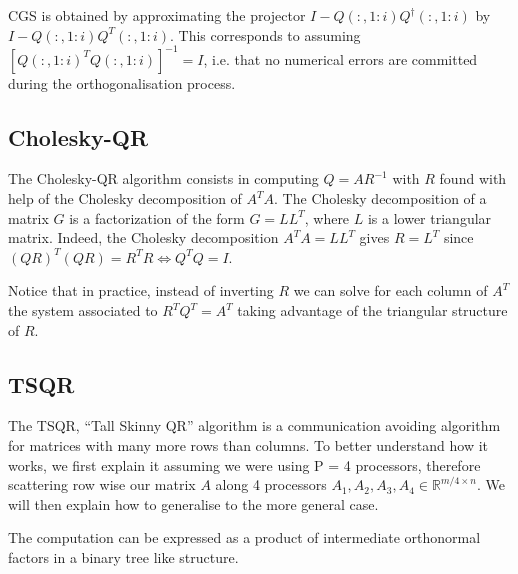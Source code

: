 \documentclass[a4paper, 12pt,oneside]{article}
\begin{document}
			CGS is obtained by approximating the projector $I-Q(:,1:i)Q^\dagger(:,1:i)$ by $I-Q(:,1:i)Q^T(:,1:i)$. This corresponds to assuming $[Q(:,1:i)^TQ(:,1:i)]^{-1}=I$, i.e. that no numerical errors are committed during the orthogonalisation process. 
		\subsection{Cholesky-QR}
			The Cholesky-QR algorithm consists in computing $Q=AR^{-1}$ with $R$ found with help of the Cholesky decomposition of $A^TA$. The Cholesky decomposition of a matrix ${G}$ is a factorization of the form ${G} = {L} {L}^T$, where ${L}$ is a lower triangular matrix. Indeed, the Cholesky decomposition $A^TA=LL^T$ gives $R=L^T$ since $(QR)^T(QR)=R^TR\iff Q^TQ=I$. 
			
			Notice that in practice, instead of inverting $R$ we can solve for each column of $A^T$ the system associated to $R^TQ^T=A^T$ taking advantage of the triangular structure of $R$.
		\subsection{TSQR}
		The TSQR, ``Tall Skinny QR'' algorithm is a communication avoiding algorithm for matrices with many more rows than columns. 
		To better understand how it works, we first explain it assuming we were using P = 4 processors, therefore scattering row wise our matrix $A$ along 4 processors $A_1, A_2, A_3, A_4 \in \mathbb{R}^{m / 4 \times n}$. We will then explain how to generalise to the more general case. 
		
		The computation can be expressed as a product of intermediate orthonormal factors in a binary tree like structure.
\end{document}
